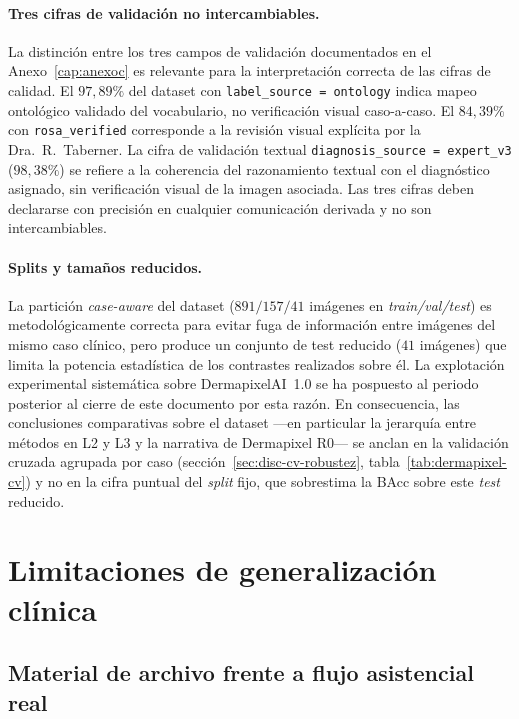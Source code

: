 \paragraph{Tres cifras de validación no intercambiables.}
La distinción entre los tres campos de validación documentados en
el Anexo~\ref{cap:anexoc} es relevante para la interpretación
correcta de las cifras de calidad. El $97{,}89\%$ del dataset
con \texttt{label\_source = ontology} indica mapeo ontológico
validado del vocabulario, no verificación visual caso-a-caso. El
$84{,}39\%$ con \texttt{rosa\_verified} corresponde a la revisión
visual explícita por la Dra.~R.~Taberner. La cifra de validación
textual \texttt{diagnosis\_source = expert\_v3} ($98{,}38\%$) se
refiere a la coherencia del razonamiento textual con el
diagnóstico asignado, sin verificación visual de la imagen
asociada. Las tres cifras deben declararse con precisión en
cualquier comunicación derivada y no son intercambiables.

\paragraph{Splits y tamaños reducidos.}
La partición \emph{case-aware} del dataset
($891 / 157 / 41$ imágenes en \emph{train/val/test}) es
metodológicamente correcta para evitar fuga de información entre
imágenes del mismo caso clínico, pero produce un conjunto de test
reducido ($41$ imágenes) que limita la potencia estadística de
los contrastes realizados sobre él. La explotación experimental
sistemática sobre DermapixelAI~1.0 se ha pospuesto al periodo
posterior al cierre de este documento por esta razón. En consecuencia,
las conclusiones comparativas sobre el dataset ---en particular la
jerarquía entre métodos en L2 y L3 y la narrativa de Dermapixel R0---
se anclan en la validación cruzada agrupada por caso
(sección~\ref{sec:disc-cv-robustez}, tabla~\ref{tab:dermapixel-cv}) y
no en la cifra puntual del \emph{split} fijo, que sobrestima la BAcc
sobre este \emph{test} reducido.

\section{Limitaciones de generalización clínica}
\label{sec:lim-clinica}

\subsection{Material de archivo frente a flujo asistencial real}
\label{sec:lim-archivo}

